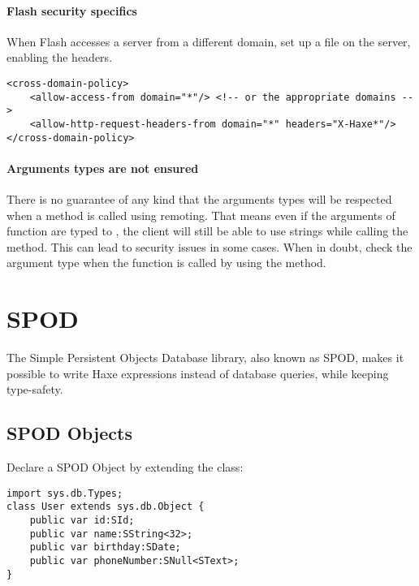 \paragraph{Flash security specifics}

When Flash accesses a server from a different domain, set up a  file on the server, enabling the  headers.

\begin{lstlisting} 
<cross-domain-policy>
	<allow-access-from domain="*"/> <!-- or the appropriate domains -->
	<allow-http-request-headers-from domain="*" headers="X-Haxe*"/>
</cross-domain-policy>
\end{lstlisting} 

\paragraph{Arguments types are not ensured}

There is no guarantee of any kind that the arguments types will be respected when a method is called using remoting. 
That means even if the arguments of function  are typed to , the client will still be able to use strings while calling the method. 
This can lead to security issues in some cases. When in doubt, check the argument type when the function is called by using the  method.


\section{SPOD}
\label{std-spod}

The Simple Persistent Objects Database library, also known as SPOD, makes it possible to write Haxe expressions instead of database queries, while keeping type-safety.

\subsection{SPOD Objects}
\label{std-spod-objects}

Declare a SPOD Object by extending the  class:

\begin{lstlisting} 
import sys.db.Types;
class User extends sys.db.Object {
    public var id:SId;
    public var name:SString<32>;
    public var birthday:SDate;
    public var phoneNumber:SNull<SText>;
}
\end{lstlisting} 

